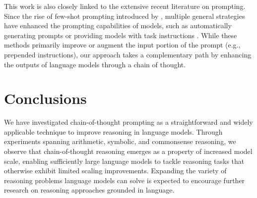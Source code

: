 This work is also closely linked to the extensive recent literature on prompting. Since the rise of few-shot prompting introduced by \citet{brown2020language}, multiple general strategies have enhanced the prompting capabilities of models, such as automatically generating prompts \citep{lester-etal-2021-power} or providing models with task instructions \citep{wei2021finetuned,sanh2021multitask,ouyang2022training}. While these methods primarily improve or augment the input portion of the prompt (e.g., prepended instructions), our approach takes a complementary path by enhancing the outputs of language models through a chain of thought.

\section{Conclusions}
We have investigated chain-of-thought prompting as a straightforward and widely applicable technique to improve reasoning in language models. Through experiments spanning arithmetic, symbolic, and commonsense reasoning, we observe that chain-of-thought reasoning emerges as a property of increased model scale, enabling sufficiently large language models to tackle reasoning tasks that otherwise exhibit limited scaling improvements. Expanding the variety of reasoning problems language models can solve is expected to encourage further research on reasoning approaches grounded in language.

